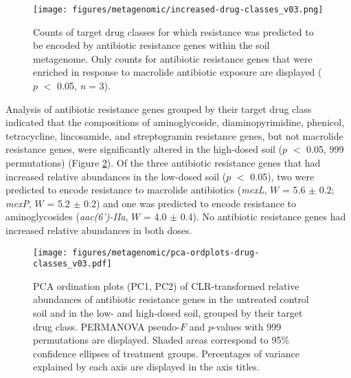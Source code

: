 \begin{figure}[htpb]
	\centering
		\texttt{[image: figures/metagenomic/increased-drug-classes\_v03.png]}
	\caption[Counts of target drug classes for enriched metagenomic antibiotic resistance genes.]{
		Counts of target drug classes for which resistance was predicted to be encoded by antibiotic resistance genes within the soil metagenome.
		Only counts for antibiotic resistance genes that were enriched in response to macrolide antibiotic exposure are displayed ($p$ $<$ 0.05, \textit{n} = 3).
	}
	\label{fig:increased-drug-classes}
\end{figure}

Analysis of antibiotic resistance genes grouped by their target drug class indicated that the compositions of aminoglycoside, diaminopyrimidine, phenicol, tetracycline, lincosamide, and streptogramin resistance genes, but not macrolide resistance genes, were significantly altered in the high-dosed soil ($p$ $<$ 0.05, 999 permutations) (Figure \ref{fig:pca-ordplots-drug-classes}).
Of the three antibiotic resistance genes that had increased relative abundances in the low-dosed soil ($p$ $<$ 0.05), two were predicted to encode resistance to macrolide antibiotics (\textit{mexL}, $W$ = 5.6 $\pm$ 0.2; \textit{mexP}, $W$ = 5.2 $\pm$ 0.2) and one was predicted to encode resistance to aminoglycosides (\textit{aac(6’)-IIa}, $W$ = 4.0 $\pm$ 0.4). No antibiotic resistance genes had increased relative abundances in both doses.

\begin{figure}[htpb]
	\centering
		\texttt{[image: figures/metagenomic/pca-ordplots-drug-classes\_v03.pdf]}
	\caption[PCA ordination plots of metagenomic antibiotic resistance genes grouped by target drug class.]{
		PCA ordination plots (PC1, PC2) of CLR-transformed relative abundances of antibiotic resistance genes in the untreated control soil and in the low- and high-dosed soil, grouped by their target drug class.
		PERMANOVA pseudo-$F$ and $p$-values with 999 permutations are displayed.
		Shaded areas correspond to 95\% confidence ellipses of treatment groups.
		Percentages of variance explained by each axis are displayed in the axis titles.
	}
	\label{fig:pca-ordplots-drug-classes}
\end{figure}

